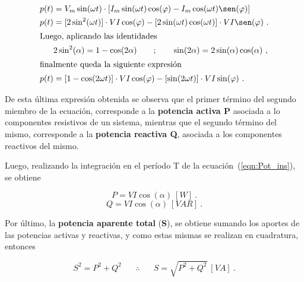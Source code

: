         \vspace{-15pt}
         \begin{align}
            p(t)  &= V_m \sin(\omega t)\cdot [I_m \sin(\omega t) \cos(\varphi) - I_m \cos(\omega t) \sen(\varphi)]  \notag \\
            p(t)   &= [2 \sin^{2}(\omega t)]\cdot V I \cos(\varphi) - [2 \sin(\omega t) \cos(\omega t)]\cdot V I\sen(\varphi) ~.\notag \\
            \intertext{Luego, aplicando las identidades}
                  &2 \sin^{2}(\alpha)  = 1 - \cos(2\alpha) \hspace{20pt} ; \hspace{20pt} \sin(2\alpha) = 2 \sin(\alpha) \cos(\alpha) \ , \notag \\
            \intertext{finalmente queda la siguiente expresión}
            p(t)  &= [1- \cos(2 \omega t)]\cdot V I \cos(\varphi) - [\sin(2 \omega t)]\cdot V I \sin(\varphi) ~. 
         \label{eqn:Pot_ins}
         \end{align}

      De esta última expresión obtenida se observa que el primer término del segundo miembro
      de la ecuación, corresponde a la \textbf{potencia activa P} asociada a lo componentes
      resistivos de un sistema, mientras que el segundo término del mismo, corresponde a la 
      \textbf{potencia reactiva Q}, asociada a los componentes reactivos del mismo.

      Luego, realizando la integración en el período T de la ecuación~(\ref{eqn:Pot_ins}), se obtiene

        \begin{equation}
            \boxed{P   = V I \cos(\alpha)~[W]}~.  \label{eqn:PotActTot}
        \end{equation}
        \begin{equation}
            \boxed{Q   = V I \cos(\alpha)~[VAR]}~. \label{eqn:PotReacTot}
        \end{equation}

      Por último, la \textbf{potencia aparente total} (\textbf{S}), se obtiene  sumando los aportes de
      las potencias activas y reactivas, y como estas mismas se realizan en cuadratura, entonces

        \begin{equation}
            S^{2} = P^{2} + Q^{2} \hspace{20pt} \therefore \hspace{20pt} \boxed{S = \sqrt{P^{2} + Q^{2}}~[VA]} ~. \label{eqn:PotApaTot}       
         \end{equation}


